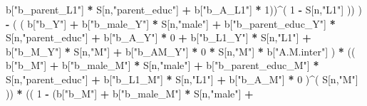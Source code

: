 \documentclass[
]{book}
\newenvironment{Shaded}{\begin{snugshade}}{\end{snugshade}}
\newcommand{\DecValTok}[1]{\textcolor[rgb]{0.00,0.00,0.81}{#1}}
\newcommand{\NormalTok}[1]{#1}
\newcommand{\SpecialCharTok}[1]{\textcolor[rgb]{0.81,0.36,0.00}{\textbf{#1}}}
\newcommand{\StringTok}[1]{\textcolor[rgb]{0.31,0.60,0.02}{#1}}
\begin{document}
\begin{Shaded}
\begin{Highlighting}[]
\NormalTok{                                   b[}\StringTok{"b\_parent\_L1"}\NormalTok{] }\SpecialCharTok{*}\NormalTok{ S[n,}\StringTok{"parent\_educ"}\NormalTok{] }\SpecialCharTok{+}
\NormalTok{                                   b[}\StringTok{"b\_A\_L1"}\NormalTok{] }\SpecialCharTok{*} \DecValTok{1}\NormalTok{))}\SpecialCharTok{\^{}}\NormalTok{( }\DecValTok{1} \SpecialCharTok{{-}}\NormalTok{ S[n,}\StringTok{"L1"}\NormalTok{] )) ) }\SpecialCharTok{{-}} 
\NormalTok{                    ( ( b[}\StringTok{"b\_Y"}\NormalTok{] }\SpecialCharTok{+} 
\NormalTok{                          b[}\StringTok{"b\_male\_Y"}\NormalTok{] }\SpecialCharTok{*}\NormalTok{ S[n,}\StringTok{"male"}\NormalTok{] }\SpecialCharTok{+} 
\NormalTok{                          b[}\StringTok{"b\_parent\_educ\_Y"}\NormalTok{] }\SpecialCharTok{*}\NormalTok{ S[n,}\StringTok{"parent\_educ"}\NormalTok{] }\SpecialCharTok{+} 
\NormalTok{                          b[}\StringTok{"b\_A\_Y"}\NormalTok{] }\SpecialCharTok{*} \DecValTok{0} \SpecialCharTok{+} 
\NormalTok{                          b[}\StringTok{"b\_L1\_Y"}\NormalTok{] }\SpecialCharTok{*}\NormalTok{ S[n,}\StringTok{"L1"}\NormalTok{] }\SpecialCharTok{+}
\NormalTok{                          b[}\StringTok{"b\_M\_Y"}\NormalTok{] }\SpecialCharTok{*}\NormalTok{ S[n,}\StringTok{"M"}\NormalTok{] }\SpecialCharTok{+}
\NormalTok{                          b[}\StringTok{"b\_AM\_Y"}\NormalTok{] }\SpecialCharTok{*} \DecValTok{0} \SpecialCharTok{*}\NormalTok{ S[n,}\StringTok{"M"}\NormalTok{] }\SpecialCharTok{*}\NormalTok{ b[}\StringTok{"A.M.inter"}\NormalTok{] ) }\SpecialCharTok{*}
\NormalTok{                        (( b[}\StringTok{"b\_M"}\NormalTok{] }\SpecialCharTok{+} 
\NormalTok{                             b[}\StringTok{"b\_male\_M"}\NormalTok{] }\SpecialCharTok{*}\NormalTok{ S[n,}\StringTok{"male"}\NormalTok{] }\SpecialCharTok{+} 
\NormalTok{                             b[}\StringTok{"b\_parent\_educ\_M"}\NormalTok{] }\SpecialCharTok{*}\NormalTok{ S[n,}\StringTok{"parent\_educ"}\NormalTok{] }\SpecialCharTok{+} 
\NormalTok{                             b[}\StringTok{"b\_L1\_M"}\NormalTok{] }\SpecialCharTok{*}\NormalTok{ S[n,}\StringTok{"L1"}\NormalTok{] }\SpecialCharTok{+}
\NormalTok{                             b[}\StringTok{"b\_A\_M"}\NormalTok{] }\SpecialCharTok{*} \DecValTok{0}\NormalTok{ )}\SpecialCharTok{\^{}}\NormalTok{( S[n,}\StringTok{"M"}\NormalTok{] )) }\SpecialCharTok{*}
\NormalTok{                        (( }\DecValTok{1} \SpecialCharTok{{-}}\NormalTok{ (b[}\StringTok{"b\_M"}\NormalTok{] }\SpecialCharTok{+} 
\NormalTok{                                  b[}\StringTok{"b\_male\_M"}\NormalTok{] }\SpecialCharTok{*}\NormalTok{ S[n,}\StringTok{"male"}\NormalTok{] }\SpecialCharTok{+} 

\end{Highlighting}
\end{Shaded}
\end{document}
